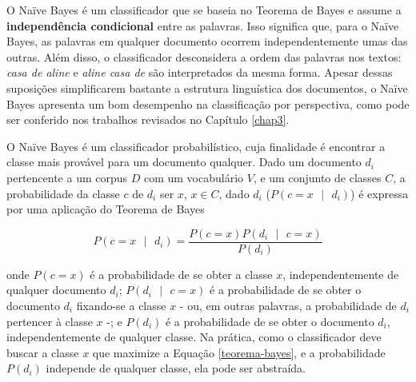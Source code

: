 O Naïve Bayes é um classificador que se baseia no Teorema de Bayes e assume a \textbf{independência condicional} entre as palavras. Isso significa que, para o Naïve Bayes, as palavras em qualquer documento ocorrem independentemente umas das outras. Além disso, o classificador desconsidera a ordem das palavras nos textos: \emph{casa de aline} e \emph{aline casa de} são interpretados da mesma forma. Apesar dessas suposições simplificarem bastante a estrutura linguística dos documentos, o Naïve Bayes apresenta um bom desempenho na classificação por perspectiva, como pode ser conferido nos trabalhos revisados no Capítulo \ref{chap3}.%


O Naïve Bayes é um classificador probabilístico, cuja finalidade é encontrar a classe mais provável para um documento qualquer. Dado um documento \ensuremath{d_i} pertencente a um corpus \ensuremath{D} com um vocabulário \ensuremath{V}, e um conjunto de classes \ensuremath{C}, a probabilidade da classe \ensuremath{c} de \ensuremath{d_i} ser \ensuremath{x}, \ensuremath{x \in C}, dado \ensuremath{d_i} (\ensuremath{P(c = x\mbox{ }|\mbox{ }d_i)}) é expressa por uma aplicação do Teorema de Bayes \cite{naive-forty}

\begin{equation}
\label{teorema-bayes}
\ensuremath{P(c = x\mbox{ }|\mbox{ }d_i) = \frac{P(c = x)P(d_i\mbox{ }|\mbox{ }c = x)}{P(d_i)}}
\end{equation}

onde \ensuremath{P(c = x)} é a probabilidade de se obter a classe \ensuremath{x}, independentemente de qualquer documento \ensuremath{d_i}; \ensuremath{P(d_i\mbox{ }|\mbox{ }c = x)} é a probabilidade de se obter o documento \ensuremath{d_i} fixando-se a classe \ensuremath{x} - ou, em outras palavras, a probabilidade de \ensuremath{d_i} pertencer à classe \ensuremath{x} -; e \ensuremath{P(d_i)} é a probabilidade de se obter o documento \ensuremath{d_i}, independentemente de qualquer classe. Na prática, como o classificador deve buscar a classe \ensuremath{x} que maximize a Equação \ref{teorema-bayes}, e a probabilidade \ensuremath{P(d_i)} independe de qualquer classe, ela pode ser abstraída. 




